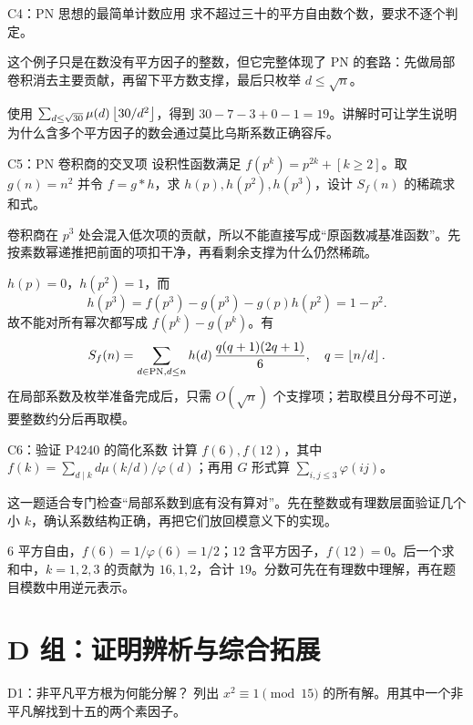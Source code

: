 \begin{problem}{C4：PN 思想的最简单计数应用}
求不超过三十的平方自由数个数，要求不逐个判定。
\end{problem}

\begin{pitfall}[讲解：先看这题到底在做什么]
这个例子只是在数没有平方因子的整数，但它完整体现了 PN 的套路：先做局部卷积消去主要贡献，再留下平方数支撑，最后只枚举 $d\le\sqrt n$。
\end{pitfall}

\sol 使用 $\sum_{d\le\sqrt{30}}\mu(d)\left\lfloor 30/d^2\right\rfloor$，得到 $30-7-3+0-1=19$。讲解时可让学生说明为什么含多个平方因子的数会通过莫比乌斯系数正确容斥。


\begin{problem}{C5：PN 卷积商的交叉项}
设积性函数满足 $f(p^k)=p^{2k}+[k\ge2]$。取 $g(n)=n^2$ 并令 $f=g*h$，求 $h(p),h(p^2),h(p^3)$，设计 $S_f(n)$ 的稀疏求和式。
\end{problem}

\begin{pitfall}[讲解：先看这题到底在做什么]
卷积商在 $p^3$ 处会混入低次项的贡献，所以不能直接写成“原函数减基准函数”。先按素数幂递推把前面的项扣干净，再看剩余支撑为什么仍然稀疏。
\end{pitfall}

\sol $h(p)=0$，$h(p^2)=1$，而
\[
 h(p^3)=f(p^3)-g(p^3)-g(p)h(p^2)=1-p^2.
\]
故不能对所有幂次都写成 $f(p^k)-g(p^k)$。有
\[
 S_f(n)=\sum_{d\in\mathrm{PN},d\le n}h(d)\,
 \frac{q(q+1)(2q+1)}6,\quad q=\left\lfloor n/d\right\rfloor.
\]
在局部系数及枚举准备完成后，只需 $O(\sqrt n)$ 个支撑项；若取模且分母不可逆，要整数约分后再取模。


\begin{problem}{C6：验证 P4240 的简化系数}
计算 $f(6),f(12)$，其中 $f(k)=\sum_{d\mid k}d\mu(k/d)/\varphi(d)$；再用 $G$ 形式算 $\sum_{i,j\le3}\varphi(ij)$。
\end{problem}

\begin{pitfall}[讲解：先看这题到底在做什么]
这一题适合专门检查“局部系数到底有没有算对”。先在整数或有理数层面验证几个小 $k$，确认系数结构正确，再把它们放回模意义下的实现。
\end{pitfall}

\sol $6$ 平方自由，$f(6)=1/\varphi(6)=1/2$；$12$ 含平方因子，$f(12)=0$。后一个求和中，$k=1,2,3$ 的贡献为 $16,1,2$，合计 $19$。分数可先在有理数中理解，再在题目模数中用逆元表示。


\section{D 组：证明辨析与综合拓展}
\begin{problem}{D1：非平凡平方根为何能分解？}
列出 $x^2\equiv1\pmod{15}$ 的所有解。用其中一个非平凡解找到十五的两个素因子。
\end{problem}

